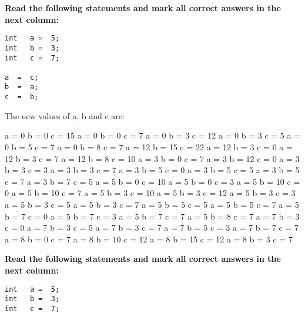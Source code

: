 \documentclass[10pt]{exam}
\begin{document}
\begin{questions}
\vspace{1cm}  \begin{minipage}[t][][t]{0.18\textwidth}
\question \bf Read the following statements and mark all correct answers in the next column: \raggedright
  \begin{lstlisting}
int   a =  5;
int   b =  3;
int   c =  7;

a  =  c;
b  =  a;
c  =  b;
  \end{lstlisting}
\end{minipage}
  \hfill
\begin{minipage}[t][][t]{0.75\textwidth}
  The new values of a, b and c are:
  \begin{multicols*}{3}
\begin{checkboxes}
    \choice a = 0 b = 0 c = 15
    \choice a = 0 b = 0 c = 7
    \choice a = 0 b = 3 c = 12
    \choice a = 0 b = 3 c = 5
    \choice a = 0 b = 5 c = 7
    \choice a = 0 b = 8 c = 7
    \choice a = 12 b = 15 c = 22
    \choice a = 12 b = 3 c = 0
    \choice a = 12 b = 3 c = 7
    \choice a = 12 b = 8 c = 10
    \choice a = 3 b = 0 c = 7
    \choice a = 3 b = 12 c = 0
    \choice a = 3 b = 3 c = 3
    \choice a = 3 b = 3 c = 7
    \choice a = 3 b = 5 c = 0
    \choice a = 3 b = 5 c = 5
    \choice a = 3 b = 5 c = 7
    \choice a = 3 b = 7 c = 5
    \choice a = 5 b = 0 c = 10
    \choice a = 5 b = 0 c = 3
    \choice a = 5 b = 10 c = 0
    \choice a = 5 b = 10 c = 7
    \choice a = 5 b = 3 c = 10
    \choice a = 5 b = 3 c = 12
    \choice a = 5 b = 3 c = 3
    \choice a = 5 b = 3 c = 5
    \choice a = 5 b = 3 c = 7
    \choice a = 5 b = 5 c = 5
    \choice a = 5 b = 5 c = 7
    \choice a = 5 b = 7 c = 0
    \choice a = 5 b = 7 c = 3
    \choice a = 5 b = 7 c = 7
    \choice a = 5 b = 8 c = 7
    \choice a = 7 b = 3 c = 0
    \choice a = 7 b = 3 c = 5
    \choice a = 7 b = 3 c = 7
    \choice a = 7 b = 5 c = 3
    \choice a = 7 b = 7 c = 7
    \choice a = 8 b = 0 c = 7
    \choice a = 8 b = 10 c = 12
    \choice a = 8 b = 15 c = 12
    \choice a = 8 b = 3 c = 7
  \end{checkboxes}
\end{multicols*}
\end{minipage}

\vspace{1cm}  \begin{minipage}[t][][t]{0.18\textwidth}
\question \bf Read the following statements and mark all correct answers in the next column: \raggedright
  \begin{lstlisting}
int   a =  5;
int   b =  3;
int   c =  7;


\end{lstlisting}
\end{minipage}
\end{questions}
\end{document}
